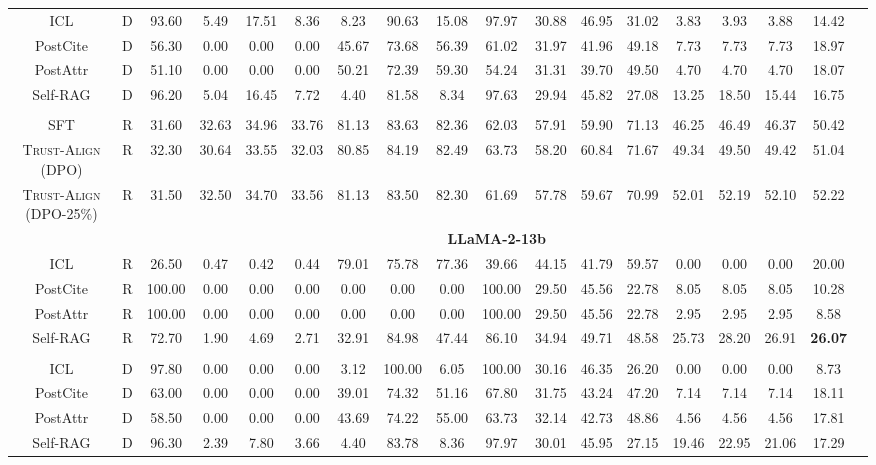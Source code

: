 \documentclass{article} %
\newcommand{\method}[0]{\textsc{Trust-Align}}
\begin{document}
\begin{table}[htb!]
{\begin{tabular}{ccc*{15}c}
ICL & D & 93.60 & 5.49 & 17.51 & 8.36 & 8.23 & 90.63 & 15.08 & 97.97 & 30.88 & 46.95 & 31.02 & 3.83 & 3.93 & 3.88 & 14.42 \\
PostCite & D & 56.30 & 0.00 & 0.00 & 0.00 & 45.67 & 73.68 & 56.39 & 61.02 & 31.97 & 41.96 & 49.18 & 7.73 & 7.73 & 7.73 & 18.97 \\
PostAttr & D & 51.10 & 0.00 & 0.00 & 0.00 & 50.21 & 72.39 & 59.30 & 54.24 & 31.31 & 39.70 & 49.50 & 4.70 & 4.70 & 4.70 & 18.07 \\
Self-RAG & D & 96.20 & 5.04 & 16.45 & 7.72 & 4.40 & 81.58 & 8.34 & 97.63 & 29.94 & 45.82 & 27.08 & 13.25 & 18.50 & 15.44 & 16.75 \\\\

SFT & R & 31.60 & 32.63 & 34.96 & 33.76 & 81.13 & 83.63 & 82.36 & 62.03 & 57.91 & 59.90 & 71.13 & 46.25 & 46.49 & 46.37 & 50.42 \\
\method{} (DPO) & R & 32.30 & 30.64 & 33.55 & 32.03 & 80.85 & 84.19 & 82.49 & 63.73 & 58.20 & 60.84 & 71.67 & 49.34 & 49.50 & 49.42 & 51.04 \\
\method{} (DPO-25\%) & R & 31.50 & 32.50 & 34.70 & 33.56 & 81.13 & 83.50 & 82.30 & 61.69 & 57.78 & 59.67 & 70.99 & 52.01 & 52.19 & 52.10 & 52.22 \\

& & \multicolumn{15}{c}{\cellcolor[gray]{0.9}\textbf{LLaMA-2-13b}} \\
ICL & R & 26.50 & 0.47 & 0.42 & 0.44 & 79.01 & 75.78 & 77.36 & 39.66 & 44.15 & 41.79 & 59.57 & 0.00 & 0.00 & 0.00 & 20.00 \\
PostCite & R & 100.00 & 0.00 & 0.00 & 0.00 & 0.00 & 0.00 & 0.00 & 100.00 & 29.50 & 45.56 & 22.78 & 8.05 & 8.05 & 8.05 & 10.28 \\
PostAttr & R & 100.00 & 0.00 & 0.00 & 0.00 & 0.00 & 0.00 & 0.00 & 100.00 & 29.50 & 45.56 & 22.78 & 2.95 & 2.95 & 2.95 & 8.58 \\
Self-RAG & R & 72.70 & 1.90 & 4.69 & 2.71 & 32.91 & 84.98 & 47.44 & 86.10 & 34.94 & 49.71 & 48.58 & 25.73 & 28.20 & 26.91 & \bf 26.07 \\\\
ICL & D & 97.80 & 0.00 & 0.00 & 0.00 & 3.12 & 100.00 & 6.05 & 100.00 & 30.16 & 46.35 & 26.20 & 0.00 & 0.00 & 0.00 & 8.73 \\
PostCite & D & 63.00 & 0.00 & 0.00 & 0.00 & 39.01 & 74.32 & 51.16 & 67.80 & 31.75 & 43.24 & 47.20 & 7.14 & 7.14 & 7.14 & 18.11 \\
PostAttr & D & 58.50 & 0.00 & 0.00 & 0.00 & 43.69 & 74.22 & 55.00 & 63.73 & 32.14 & 42.73 & 48.86 & 4.56 & 4.56 & 4.56 & 17.81 \\
Self-RAG & D & 96.30 & 2.39 & 7.80 & 3.66 & 4.40 & 83.78 & 8.36 & 97.97 & 30.01 & 45.95 & 27.15 & 19.46 & 22.95 & 21.06 & 17.29 \\


\end{tabular}}
\end{table}
\end{document}
